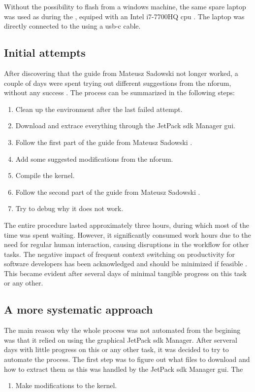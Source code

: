 Without the possibility to flash from a windows machine, the same spare laptop was used as during the \preproject, equiped with an Intel i7-7700HQ \gls{cpu} \cite{martensPortableSensorRig2022}.
The laptop was directly connected to the \jx using a usb-c cable.



\subsection{Initial attempts}
After discovering that the guide from Mateusz Sadowski not longer worked, a couple of days were spent trying out different suggestions from the \gls{nforum}, without any success \cite{martensPortableSensorRig2022}.
The process can be summarized in the following steps:
\begin{enumerate}
    \item Clean up the environment after the last failed attempt.
    \item Download and extrace everything through the JetPack \gls{sdk} Manager gui.
    \item Follow the first part of the guide from Mateusz Sadowski \cite{sadowskiEnablingPPSJetson2020}.
    \item Add some suggested modifications from the \gls{nforum}.
    \item Compile the kernel.
    \item Follow the second part of the guide from Mateusz Sadowski \cite{sadowskiEnablingPPSJetson2020}.
    \item Try to debug why it does not work.
\end{enumerate}
The entire procedure lasted approximately three hours, during which most of the time was spent waiting.
However, it significantly consumed work hours due to the need for regular human interaction, causing disruptions in the workflow for other tasks.
The negative impact of frequent context switching on productivity for software developers has been acknowledged and should be minimized if feasible \cite{meyerSoftwareDevelopersPerceptions2014}.
This became evident after several days of minimal tangible progress on this task or any other.


\subsection{A more systematic approach}
The main reason why the whole process was not automated from the begining was that it relied on using the graphical JetPack \gls{sdk} Manager.
After serveral days with little progress on this or any other task, it was decided to try to automate the process.
The first step was to figure out what files to download and how to extract them as this was handled by the JetPack \gls{sdk} Manager gui.
The
\begin{enumerate}
    \item Make modifications to the kernel.
\end{enumerate}


